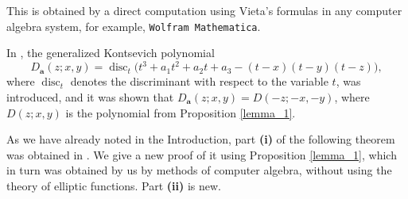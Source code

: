 \documentclass[14pt, dvipsnames]{extarticle}
\makeatletter
\theoremstyle{plain}
\theoremstyle{definition}
\theoremstyle{remark}
\renewenvironment{proof}[1][\proofname]{
  \par\pushQED{\qed}\normalfont
  \topsep6\p@\@plus6\p@\relax
  \trivlist\item[\hskip\labelsep\bfseries\itshape #1\@addpunct{.}]
}{\popQED\endtrivlist\@endpefalse}
\DeclareMathOperator{\disc}{\mathrm{disc}}
\makeatother
\begin{document}
\begin{proof}
This is obtained by a direct computation using Vieta's formulas in any computer algebra system, for example, {\tt Wolfram Mathematica}.
\end{proof}

{In \cite{Kontsevich_type_polynomials}, the generalized Kontsevich polynomial
$$D_{\boldsymbol{a}}(z; x, y) = \disc_t\!\bigl(t^3 + a_1 t^2 + a_2 t + a_3 - (t - x)(t - y)(t - z)\bigr),$$
where $\disc_t$ denotes the discriminant with respect to the variable $t$, was introduced, and it was shown that $D_{\boldsymbol{a}}(z; x, y)  = D(-z; -x, -y)$, where $D(z; x, y)$ is the polynomial from Proposition \ref{lemma_1}.}

As we have already noted in the Introduction, part {\bf (i)} of the following theorem was obtained in \cite[Theorem 4.7]{Kontsevich_type_polynomials}. We give a new proof of it using Proposition \ref{lemma_1}, which in turn was obtained by us by methods of computer algebra, without using the theory of elliptic functions. Part {\bf (ii)} is new.
\end{document}
